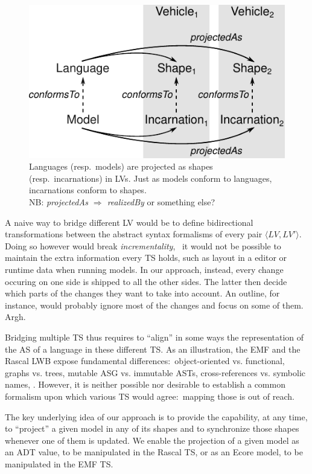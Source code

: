 \begin{figure}
	\centering
	\includegraphics[width=.8\columnwidth]{figures/concepts}
	\caption{Languages (resp.~models) are projected as shapes (resp.~incarnations) in LVs. Just as models conform to languages, incarnations conform to shapes.\\NB: \emph{projectedAs $\Rightarrow$ realizedBy} or something else?}
	\label{fig:concepts}
\end{figure}

A naive way to bridge different LV would be to define bidirectional transformations between the abstract syntax formalisms of every pair $\langle LV, LV' \rangle$.
Doing so however would break \emph{incrementality}, \ie~it would not be possible to maintain the extra information every TS holds, such as layout in a editor or runtime data when running models.
In our approach, instead, every change occuring on one side is shipped to all the other sides.
The latter then decide which parts of the changes they want to take into account.
An outline, for instance, would probably ignore most of the changes and focus on some of them. Argh.

Bridging multiple TS thus requires to ``align'' in some ways the representation of the AS of a language in these different TS.
As an illustration, the EMF and the Rascal LWB expose fundamental differences:~object-oriented vs. functional, graphs vs. trees, mutable ASG vs. immutable ASTs, cross-references vs. symbolic names, \etc.
However, it is neither possible nor desirable to establish a common formalism upon which various TS would agree:~mapping those is out of reach.

The key underlying idea of our approach is to provide the capability, at any time, to ``project'' a given model in any of its shapes and to synchronize those shapes whenever one of them is updated.
We enable the projection of a given model as an ADT value, to be manipulated in the Rascal TS, or as an Ecore model, to be manipulated in the EMF TS.

